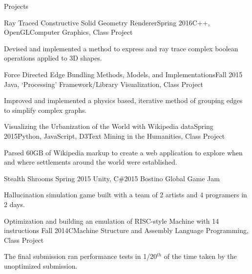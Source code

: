 \documentclass{resume}
\begin{document}
  \begin{rSection}{Projects}
    \begin{rSubsection}{Ray Traced Constructive Solid Geometry Renderer}{Spring 2016}{C++, OpenGL}{Computer Graphics, Class Project}
    \item Devised and implemented a method to express and ray trace complex boolean operations applied to 3D shapes.
    \end{rSubsection}
    \begin{rSubsection}{Force Directed Edge Bundling Methods, Models, and Implementations}{Fall 2015}
    {Java, `Processing' Framework/Library} {Visualization, Class Project}
    \item Improved and implemented a physics based, iterative method of grouping edges to simplify complex graphs.
    \end{rSubsection}
    \begin{rSubsection}{Visualizing the Urbanization of the World with Wikipedia data}{Spring 2015}{Python, JavaScript, D3}{Text Mining in the Humanities, Class Project}
    \item Parsed 60GB of Wikipedia markup to create a web application to explore when and where settlements around the world were established.
    \end{rSubsection}
    \begin{rSubsection}{Stealth Shrooms} {Spring 2015} {Unity, C\#}{2015 Bostino Global Game Jam}
    \item Hallucination simulation game built with a team of 2 artists and 4 programers in 2 days.
    \end{rSubsection}
    \begin{rSubsection}{Optimization and building an emulation of RISC-style Machine with 14 instructions }{Fall 2014}{C}{Machine Structure and Assembly Language Programming, Class Project}
    \item The final submission ran performance tests in 1/20$^{th}$ of the time taken by the unoptimized submission.
    \end{rSubsection}
  
  \end{rSection}
  
\end{document}

